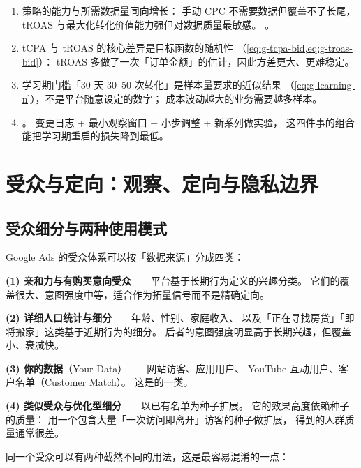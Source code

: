 \begin{keypoint}[出价策略的选择与维护]
\begin{enumerate}
  \item 策略的能力与所需数据量同向增长：
        手动 CPC 不需要数据但覆盖不了长尾，
        tROAS 与最大化转化价值能力强但对数据质量最敏感。
        。
  \item tCPA 与 tROAS 的核心差异是目标函数的随机性
        （\cref{eq:g-tcpa-bid,eq:g-troas-bid}）：
        tROAS 多做了一次「订单金额」的估计，因此方差更大、更难稳定。
  \item 学习期门槛「30 天 30--50 次转化」是样本量要求的近似结果
        （\cref{eq:g-learning-n}），不是平台随意设定的数字；
        成本波动越大的业务需要越多样本。
  \item {}。
        变更日志 + 最小观察窗口 + 小步调整 + 新系列做实验，
        这四件事的组合能把学习期重启的损失降到最低。
\end{enumerate}
\end{keypoint}

\section{受众与定向：观察、定向与隐私边界}
\label{sec:g-audience}

\subsection{受众细分与两种使用模式}

Google Ads 的受众体系可以按「数据来源」分成四类：

\textbf{(1) 亲和力与有购买意向受众}——平台基于长期行为定义的兴趣分类。
它们的覆盖很大、意图强度中等，适合作为拓量信号而不是精确定向。

\textbf{(2) 详细人口统计与细分}——年龄、性别、家庭收入、
以及「正在寻找房贷」「即将搬家」这类基于近期行为的细分。
后者的意图强度明显高于长期兴趣，但覆盖小、衰减快。

\textbf{(3) 你的数据}（Your Data）——网站访客、应用用户、
YouTube 互动用户、客户名单（Customer Match）。
这是的一类。

\textbf{(4) 类似受众与优化型细分}——以已有名单为种子扩展。
它的效果高度依赖种子的质量：
用一个包含大量「一次访问即离开」访客的种子做扩展，
得到的人群质量通常很差。

同一个受众可以有两种截然不同的用法，这是最容易混淆的一点：

